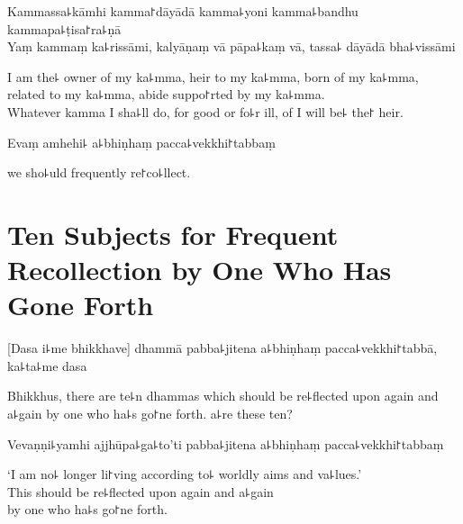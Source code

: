 \clearpage

%
Kammassa꜕kāmhi kamma꜓dāyādā kamma꜕yoni kamma꜕bandhu kammapa꜕ṭisa꜓ra꜕ṇā\\
Yaṃ kammaṃ ka꜕rissāmi, kalyāṇaṃ vā pāpa꜕kaṃ vā, tassa꜕ dāyādā bha꜕vissāmi

\begin{english}
  I am the꜕ owner of my ka꜕mma, heir to my ka꜕mma, born of my ka꜕mma,\\
  related to my ka꜕mma, abide suppo꜓rted by my ka꜕mma.\\
  Whatever kamma I sha꜕ll do, for good or fo꜕r ill, of  I will be꜕ the꜓ heir.
\end{english}

Evaṃ amhehi꜕ a꜕bhiṇhaṃ pacca꜕vekkhi꜓tabbaṃ

\begin{english}
   we sho꜕uld frequently re꜓co꜕llect.
\end{english}

\chapter[Ten Subjects]{Ten Subjects for Frequent Recollection by One Who Has Gone Forth}%


\enlargethispage{\baselineskip}

\begin{leader}
\end{leader}

[Dasa i꜕me bhikkhave] dhammā pabba꜕jitena a꜕bhiṇhaṃ pacca꜕vekkhi꜓tabbā, ka꜕ta꜕me dasa

\begin{english}
  Bhikkhus, there are te꜕n dhammas which should be re꜕flected upon again and a꜕gain by one who ha꜕s go꜓ne forth.  a꜕re these ten?
\end{english}

Vevaṇṇi꜕yamhi ajjhūpa꜕ga꜕to'ti pabba꜕jitena a꜕bhiṇhaṃ pacca꜕vekkhi꜓tabbaṃ

\begin{english}
  `I am no꜕ longer li꜓ving according to꜕ worldly aims and va꜕lues.'\\
  This should be re꜕flected upon again and a꜕gain\\
  by one who ha꜕s go꜓ne forth.
\end{english}

